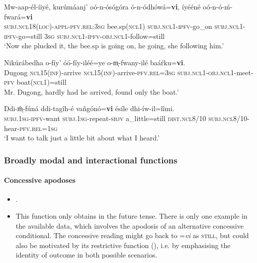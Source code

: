 \begin{exe}
	\ex
	\label{exAppendixchuwaboRestrictive1}
	\gll Mw-aap-él-íiyé, kurúmáanj’ oó-n-ósógóra ó-n-ódhówá=\textbf{vi}, íyééné oó-n-ó-ḿ-fwará=\textbf{vi}\\
	\textsc{subj}.\textsc{ncl}18(\textsc{loc})-\textsc{appl}-\textsc{pfv}.\textsc{rel}:3\textsc{sg} bee.sp(\textsc{ncl}1) \textsc{subj}.\textsc{ncl}1-\textsc{ipfv}-go\_on \textsc{subj}.\textsc{ncl}1-\textsc{ipfv}-go=still 3\textsc{sg} \textsc{subj}.\textsc{ncl}1-\textsc{ipfv}-\textsc{obj}.\textsc{ncl}1-follow=still\\
	\glt \lq Now she plucked it, the bee.sp is going on, he going, she following him.' \parencite[311]{Guerois2015}

	\ex
	\label{exAppendixchuwaboRestrictive2}
	\gll Nikúrábedha o-fíy' óó-fíy-iléé=ye o-m̩-fwany-ilé baáŕku=\textbf{vi}.\\
	Dugong \textsc{ncl}15(\textsc{inf})-arrive \textsc{ncl}15(\textsc{inf})-arrive-\textsc{pfv}.\textsc{rel}=3\textsc{sg} \textsc{subj}.\textsc{ncl}1-\textsc{obj}.\textsc{ncl}1-meet-\textsc{pfv} boat(\textsc{ncl}1)=still\\
	\glt Mr. Dugong, hardly had he arrived, found only the boat.\rq{ }\parencite[167]{Guerois2021}
	
	\ex
	\label{exAppendixchuwaboRestrictive3}
	\gll Ddi-ḿ̩-fúná ddi-tagîh-é vañgónó=\textbf{vi} ésíle dhi-íw-il=îîmi.\\
	\textsc{subj}.1\textsc{sg}-\textsc{ipfv}-want \textsc{subj}.1\textsc{sg}-repeat-\textsc{sbjv} a\_little=still \textsc{dist}.\textsc{ncl}8/10 \textsc{subj}.\textsc{ncl}8/10-hear-\textsc{pfv}.\textsc{rel}=1\textsc{sg}\\
	\glt \lq I want to talk just a little bit about what I heard.\rq{ }\parencite[167–168]{Guerois2021}
\end{exe}

\subsubsection{Broadly modal and interactional functions}
\paragraph{Concessive apodoses}
\label{appendixChuwabuConcessiveConsequent}
\begin{itemize}
	\item \textcite{Guerois2021}.
	\item This function only obtains in the future tense. There is only one example in the available data, which involves the apodosis of an alternative concessive conditional. The concessive reading might go back to \mbox{=\textit{vi}} as \textsc{still}, but could also be motivated by its restrictive function (), i.e. by emphasising the identity of outcome in both possible scenarios.
\end{itemize}

